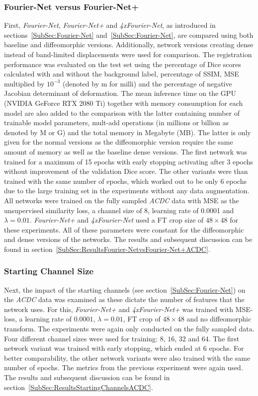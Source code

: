 \subsubsection{Fourier-Net versus Fourier-Net+} \label{SubSubSec:Fourier-NetvsFourier-Net+}
First, \emph{Fourier-Net}, \emph{Fourier-Net+} and \emph{4xFourier-Net}, as introduced in sections~\ref{SubSec:Fourier-Net} and~\ref{SubSec:Fourier-Net}, are compared using both baseline and diffeomorphic versions. Additionally, network versions creating dense instead of band-limited displacements were used for comparison. The registration performance was evaluated on the test set using the percentage of Dice scores calculated with and without the background label, percentage of SSIM, MSE multiplied by $10^{-3}$ (denoted by m for milli) and the percentage of negative Jacobian determinant of deformation. The mean inference time on the GPU (NVIDIA GeForce RTX 2080 Ti) together with memory consumption for each model are also added to the comparison with the latter containing number of trainable model parameters, mult-add operations (in millions or billion as denoted by M or G) and the total memory in Megabyte (MB). The latter is only given for the normal versions as the diffeomorphic version require the same amount of memory as well as the baseline dense versions. The first network was trained for a maximum of 15 epochs with early stopping activating after 3 epochs without improvement of the validation Dice score. The other variants were than trained with the same number of epochs, which worked out to be only 6 epochs due to the large training set in the experiments without any data augmentation. All networks were trained on the fully sampled \emph{ACDC} data with MSE as the unsupervised similarity loss, a channel size of 8, learning rate of 0.0001 and $\lambda=0.01$. \emph{Fourier-Net+} and \emph{4xFourier-Net} used a FT crop size of $48 \times 48$ for these experiments. All of these parameters were constant for the diffeomorphic and dense versions of the networks. The results and subsequent discussion can be found in section~\ref{SubSec:ResultsFourier-NetvsFourier-Net+ACDC}.


\subsubsection{Starting Channel Size} \label{SubSubSec:StartingChannelsACDC}
Next, the impact of the starting channels (see section~\ref{SubSec:Fourier-Net}) on the \emph{ACDC} data was examined as these dictate the number of features that the network uses. For this, \emph{Fourier-Net+} and \emph{4xFourier-Net+} was trained with MSE-loss, a learning rate of $0.0001$, $\lambda = 0.01$, FT crop of $48 \times 48$ and no diffeomorphic transform. The experiments were again only conducted on the fully sampled data. Four different channel sizes were used for training: $8$, $16$, $32$ and $64$. The first network variant was trained with early stopping, which ended at 6 epochs. For better comparability, the other network variants were also trained with the same number of epochs. The metrics from the previous experiment were again used. The results and subsequent discussion can be found in section~\ref{SubSec:ResultsStartingChannelsACDC}.


